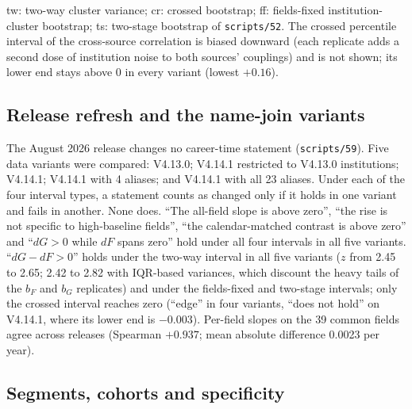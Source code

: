\documentclass[11pt]{article}
\newcommand{\scr}[1]{\texttt{scripts/#1}}
\begin{document}
\begin{table}[!tbp]
\smallskip
\begin{minipage}{0.97\textwidth}\footnotesize
tw: two-way cluster variance; cr: crossed bootstrap; ff: fields-fixed institution-cluster bootstrap; ts: two-stage
bootstrap of \scr{52}. The crossed percentile interval of the cross-source correlation is biased downward (each
replicate adds a second dose of institution noise to both sources' couplings) and is not shown; its lower end stays
above 0 in every variant (lowest $+0.16$).
\end{minipage}
\end{table}

\subsection{Release refresh and the name-join variants}\label{sec:refresh}

The August 2026 release changes no career-time statement (\scr{59}). Five data variants were compared: V4.13.0;
V4.14.1 restricted to V4.13.0 institutions; V4.14.1; V4.14.1 with 4 aliases; and V4.14.1 with all 23 aliases. Under
each of the four interval types, a statement counts as changed only if it holds in one variant and fails in another.
None does. ``The all-field slope is above zero'', ``the rise is not specific to high-baseline fields'', ``the
calendar-matched contrast is above zero'' and ``$dG>0$ while $dF$ spans zero'' hold under all four intervals in all
five variants. ``$dG-dF>0$'' holds under the two-way interval in all five variants ($z$ from 2.45 to 2.65; 2.42 to
2.82 with IQR-based variances, which discount the heavy tails of the $b_F$ and $b_G$ replicates) and under the
fields-fixed and two-stage intervals; only the crossed interval reaches zero (``edge'' in four variants, ``does not
hold'' on V4.14.1, where its lower end is $-0.003$). Per-field slopes on the 39 common fields agree across releases
(Spearman $+0.937$; mean absolute difference 0.0023 per year).

\subsection{Segments, cohorts and specificity}\label{sec:segments}
\end{document}
